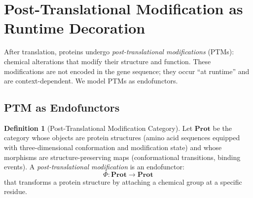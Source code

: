 \documentclass[12pt,a4paper]{article}
\theoremstyle{definition}
\newtheorem{definition}[theorem]{Definition}
\newcommand{\cat}[1]{\mathbf{#1}}
\begin{document}
\section{Post-Translational Modification as Runtime Decoration}\label{sec:ptm}

After translation, proteins undergo \emph{post-translational modifications} (PTMs): chemical alterations that modify their structure and function. These modifications are not encoded in the gene sequence; they occur ``at runtime'' and are context-dependent. We model PTMs as endofunctors.

\subsection{PTM as Endofunctors}

\begin{definition}[Post-Translational Modification Category]\label{def:ptm-category}
Let $\cat{Prot}$ be the category whose objects are protein structures (amino acid sequences equipped with three-dimensional conformation and modification state) and whose morphisms are structure-preserving maps (conformational transitions, binding events). A \emph{post-translational modification} is an endofunctor:
\[
  \Phi \colon \cat{Prot} \to \cat{Prot}
\]
that transforms a protein structure by attaching a chemical group at a specific residue.
\end{definition}
\end{document}
